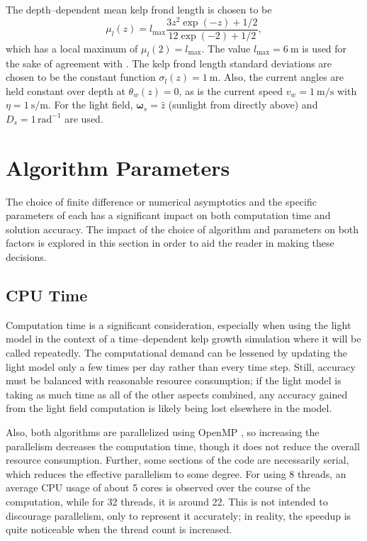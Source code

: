 \documentclass[ms,cpyr,lof,lot]{uathesis}
\renewcommand\vec\bm
\providecommand{\DIFadd}[1]{{\protect\color{blue}\uwave{#1}}} %
\providecommand{\DIFaddbegin}{} %
\providecommand{\DIFaddend}{} %
\newcommand{\DIFaddincludegraphics}[2][]{{\color{blue}\fbox{\DIFOincludegraphics[#1]{#2}}}} %
\DeclareRobustCommand{\DIFaddbegin}{\DIFOaddbegin \let\includegraphics\DIFaddincludegraphics} %
\DeclareRobustCommand{\DIFaddend}{\DIFOaddend \let\includegraphics\DIFOincludegraphics} %
\begin{document}
The depth--dependent mean kelp frond length is chosen to be
\begin{equation}
    \mu_l(z) = l_{\max}\frac{3z^2 \exp(-z) + 1/2}{12\exp(-2) + 1/2},
\end{equation}
which has a local maximum of $\mu_l(2)=l_{\max}$.
The value $l_{\max}=\SI{6}{\m}$ is used for the sake of agreement with \cite{norvik_design_2017}.
The kelp frond length standard deviations are chosen to be the constant function $\sigma_l(z) = \SI{1}{\m}$.
Also, the current angles are held constant over depth at $\theta_w(z)=0$, as is the current speed $v_w=\SI{1}{\m\per\s}$ with $\eta=\SI{1}{\s\per\m}$.
For the light field, $\vec{\omega}_s=\hat{z}$ (sunlight from directly above) and $D_s=1\, \mbox{rad}^{-1}$ are used.

\section{Algorithm Parameters}
The choice of finite difference or numerical asymptotics and the specific parameters of each has a significant impact on both computation time and solution accuracy.
The impact of the choice of algorithm and parameters on both factors is explored in this section in order to aid the reader in making these decisions.

\subsection{CPU Time}
Computation time is a significant consideration, especially when using the light model in the context of a time--dependent kelp growth simulation where it will be called repeatedly.
The computational demand can be lessened by updating the light model only a few times per day rather than every time step.
Still, accuracy must be balanced with reasonable resource consumption; if the light model is taking as much time as all of the other aspects combined, any accuracy gained from the light field computation is likely being lost elsewhere in the model.

Also, both algorithms are parallelized using OpenMP \DIFaddbegin \DIFadd{\mbox{%
\cite{message_passing_interface_forum_mpi:_1993}}\hspace{0pt}%
}\DIFaddend , so increasing the parallelism decreases the computation time, though it does not reduce the overall resource consumption. %
Further, some sections of the code are necessarily serial, which reduces the effective parallelism to some degree.
For using 8 threads, an average CPU usage of about 5 cores is observed over the course of the computation, while for 32 threads, it is around 22. %
This is not intended to discourage parallelism, only to represent it accurately; in reality, the speedup is quite noticeable when the thread count is increased.
\end{document}
